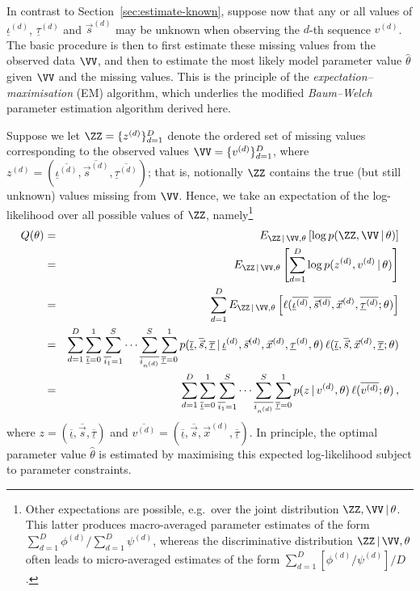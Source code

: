\documentclass[a4paper]{article}
\begin{document}
In contrast to Section~\ref{sec:estimate-known}, suppose now that any or all values of $\underline{\iota}^{(d)}$, $\underline{\tau}^{(d)}$ and $\vec{s}^{(d)}$ may be unknown
when observing the $d$-th sequence $v^{(d)}$. The basic procedure is then to first estimate these missing values from the observed data $\VV$, and then to estimate the 
most likely model parameter value $\hat{\theta}$ given $\VV$ and the missing values. This is the principle of the {\em expectation--maximisation} (EM) algorithm, which underlies the
modified {\em Baum--Welch} parameter estimation algorithm derived here.

Suppose we let $\ZZ=\{z^{(d)}\}_{d=1}^{D}$ denote the ordered set of missing values
corresponding to the observed values $\VV=\{v^{(d)}\}_{d=1}^{D}$, where $z^{(d)}=(\overline{\underline{\iota}^{(d)}},\overline{\vec{s}^{(d)}},\overline{\underline{\tau}^{(d)}})$;
that is, notionally $\ZZ$ contains the true (but still unknown) values missing from $\VV$.
Hence, we take an expectation of the log-likelihood over all possible values of
$\ZZ$, namely\footnote{Other expectations are possible, e.g.\ over the joint distribution $\ZZ,\VV\,|\,\theta$. This latter produces macro-averaged
parameter estimates of the form $\sum_{d=1}^D\phi^{(d)}/\sum_{d=1}^D\psi^{(d)}$, whereas the discriminative distribution $\ZZ\,|\,\VV,\theta$
often leads to micro-averaged estimates of the form $\sum_{d=1}^D[\phi^{(d)}/\psi^{(d)}]/D$.}
\begin{eqnarray}
  Q(\theta) & = & E_{\ZZ\,|\,\VV,\theta}\left[\log p(\ZZ,\VV\,|\,\theta)\right]
\nonumber\\& = & 
E_{\ZZ\,|\,\VV,\theta}\left[\sum_{d=1}^D \log p(z^{(d)},v^{(d)}\,|\,\theta)\right]
\nonumber\\& = & 
\sum_{d=1}^D E_{\ZZ\,|\,\VV,\theta}\left[
\ell(\overline{\underline{\iota}^{(d)}},\overline{\vec{s}^{(d)}},\vec{x}^{(d)},\overline{\underline{\tau}^{(d)}};\theta)
\right]
\nonumber\\& = & 
\sum_{d=1}^D \sum_{\overline{\underline{\iota}}=0}^{1}\sum_{\overline{i_1}=1}^{S}\cdots\sum_{\overline{i_{n^{(d)}}}}^{S}
\sum_{\overline{\underline{\tau}}=0}^{1}
p(\overline{\underline{\iota}},\overline{\vec{s}},\overline{\underline{\tau}}\,|\,\underline{\iota}^{(d)},\vec{s}^{(d)},\vec{x}^{(d)},\underline{\tau}^{(d)},\theta) 
\,\ell(\overline{\underline{\iota}},\overline{\vec{s}},\vec{x}^{(d)},\overline{\underline{\tau}};\theta)
\nonumber\\& = &
\sum_{d=1}^D \sum_{\overline{\underline{\iota}}=0}^{1}\sum_{\overline{i_1}=1}^{S}\cdots\sum_{\overline{i_{n^{(d)}}}}^{S}
\sum_{\overline{\underline{\tau}}=0}^{1}
p(z\,|\,v^{(d)},\theta) \,\ell(\overline{v^{(d)}};\theta)
\,,
\end{eqnarray}
where $z=(\overline{\underline{\iota}},\overline{\vec{s}},\overline{\underline{\tau}})$ and 
$\overline{v^{(d)}}=(\overline{\underline{\iota}},\overline{\vec{s}},\vec{x}^{(d)},\overline{\underline{\tau}})$.
In principle, the optimal parameter value $\hat{\theta}$ is estimated by maximising this expected log-likelihood subject to parameter constraints.
\end{document}
